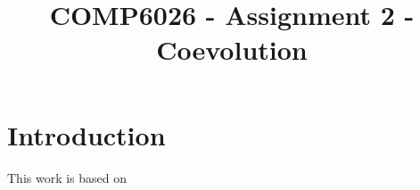\documentclass[11pt]{ecsarticle}
\title{COMP6026 - Assignment 2 - Coevolution}
\begin{document}
\maketitle
 
  \section{Introduction}
  This work is based on \cite{watson2001coevolutionary}
 
  

  
 
\end{document}
